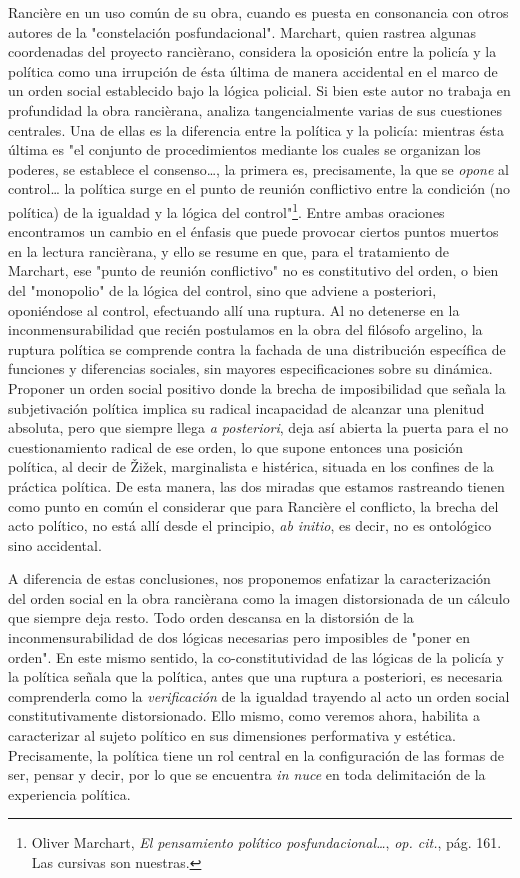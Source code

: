 \documentclass{book}
\begin{document}
Rancière en un uso común de su obra, cuando es puesta en consonancia con
otros autores de la "constelación posfundacional". Marchart, quien
rastrea algunas coordenadas del proyecto rancièrano, considera la
oposición entre la policía y la política como una irrupción de ésta
última de manera accidental en el marco de un orden social establecido
bajo la lógica policial. Si bien este autor no trabaja en profundidad la
obra rancièrana, analiza tangencialmente varias de sus cuestiones
centrales. Una de ellas es la diferencia entre la política y la policía:
mientras ésta última es "el conjunto de procedimientos mediante los
cuales se organizan los poderes, se establece el consenso\ldots, la
primera es, precisamente, la que se \emph{opone} al control\ldots{} la
política surge en el punto de reunión conflictivo entre la condición (no
política) de la igualdad y la lógica del control"\footnote{Oliver
  Marchart, \emph{El pensamiento político posfundacional\ldots{}},
  \emph{op. cit.}, pág. 161. Las cursivas son nuestras.}. Entre ambas
oraciones encontramos un cambio en el énfasis que puede provocar ciertos
puntos muertos en la lectura rancièrana, y ello se resume en que, para
el tratamiento de Marchart, ese "punto de reunión conflictivo" no es
constitutivo del orden, o bien del "monopolio" de la lógica del control,
sino que adviene a posteriori, oponiéndose al control, efectuando allí
una ruptura. Al no detenerse en la inconmensurabilidad que recién
postulamos en la obra del filósofo argelino, la ruptura política se
comprende contra la fachada de una distribución específica de funciones
y diferencias sociales, sin mayores especificaciones sobre su dinámica.
Proponer un orden social positivo donde la brecha de imposibilidad que
señala la subjetivación política implica su radical incapacidad de
alcanzar una plenitud absoluta, pero que siempre llega \emph{a
posteriori}, deja así abierta la puerta para el no cuestionamiento
radical de ese orden, lo que supone entonces una posición política, al
decir de Žižek, marginalista e histérica, situada en los confines de la
práctica política. De esta manera, las dos miradas que estamos
rastreando tienen como punto en común el considerar que para Rancière el
conflicto, la brecha del acto político, no está allí desde el principio,
\emph{ab initio}, es decir, no es ontológico sino accidental.

A diferencia de estas conclusiones, nos proponemos enfatizar la
caracterización del orden social en la obra rancièrana como la imagen
distorsionada de un cálculo que siempre deja resto. Todo orden descansa
en la distorsión de la inconmensurabilidad de dos lógicas necesarias
pero imposibles de "poner en orden". En este mismo sentido, la
co-constitutividad de las lógicas de la policía y la política señala que
la política, antes que una ruptura a posteriori, es necesaria
comprenderla como la \emph{verificación} de la igualdad trayendo al acto
un orden social constitutivamente distorsionado. Ello mismo, como
veremos ahora, habilita a caracterizar al sujeto político en sus
dimensiones performativa y estética. Precisamente, la política tiene un
rol central en la configuración de las formas de ser, pensar y decir,
por lo que se encuentra \emph{in nuce} en toda delimitación de la
experiencia política.
\end{document}
